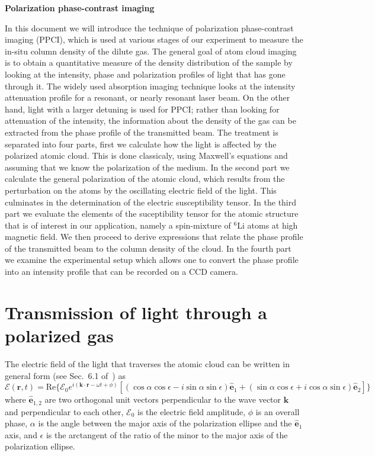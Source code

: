 \documentclass[11pt,letter]{article}
\newcommand{\bv}[1]{\ensuremath{\bm{#1}}}
\newcommand{\efield}{\ensuremath{\bv{\mathcal{E}}}}
\newcommand{\efieldo}{\ensuremath{\mathcal{E}_{0}}}
\begin{document}
{\Large \bf Polarization phase-contrast imaging}

In this document we will introduce the technique of polarization phase-contrast
imaging (PPCI), which is used at various stages of our experiment to measure
the in-situ column density of the dilute gas.   The general goal of atom
cloud imaging is to obtain a quantitative measure of the density distribution
of the sample by looking at the intensity, phase and polarization profiles of
light that has gone through it.    The widely used absorption imaging
technique looks at the intensity attenuation profile for a resonant, or nearly
resonant laser beam.   On the other hand, light with a larger detuning is used
for PPCI; rather than looking for attenuation of the intensity, the information
about the density of the gas can be extracted from the phase profile of the
transmitted beam.   The treatment is separated into four parts, first we
calculate how the light is affected by the polarized atomic cloud.  This is
done classicaly, using Maxwell's equations and assuming that we know the
polarization of the medium.  In the second part we calculate the general
polarization of the atomic cloud, which results from the perturbation on the
atoms by the oscillating electric field of the light. This culminates in the
determination of the electric susceptibility tensor.  In the third part we
evaluate the elements of the suceptibility tensor for the atomic structure that
is of interest in our application, namely a spin-mixture of $^{6}$Li atoms at
high magnetic field.  We then proceed to derive expressions that relate the
phase profile of the transmitted beam to the column density of the cloud.
In the fourth part we examine the experimental setup which allows one to
convert the phase profile into an intensity profile that can be recorded on a
CCD camera.  
 
\section{Transmission of light through a polarized gas} 

The electric field of the light that traverses the atomic cloud can be written
in general form (see Sec.~6.1 of~\cite{auzinsh2010optically}) as \begin{equation}
 \efield( \bv{r}, t ) = 
     \text{Re}\lbrace \efieldo e^{i(\bv{k}\cdot\bv{r} - \omega t + \phi )} 
     [ ( \cos\alpha \cos \epsilon - i \sin\alpha\sin\epsilon) \bv{\hat{e}}_{1} 
   + (\sin\alpha \cos\epsilon + i \cos\alpha\sin\epsilon) \bv{\hat{e}}_{2} ] \rbrace 
  \label{eq:efield-param}
\end{equation}
where $\bv{\hat{e}}_{1,2}$ are two orthogonal unit vectors perpendicular to the
wave vector $\bv{k}$ and perpendicular to each other,  $\efieldo$ is the
electric field amplitude, $\phi$ is an overall phase,  $\alpha$ is the angle
between the major axis of the polarization ellipse and the $\bv{\hat{e}}_{1}$
axis, and $\epsilon$ is the arctangent of the ratio of the minor to the major
axis of the polarization ellipse. 
\end{document}
